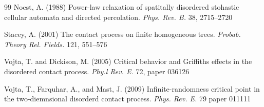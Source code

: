 \documentclass[11pt]{article}
\theoremstyle{definition}
\begin{document}
\begin{thebibliography}{99}
Noest, A. (1988)
Power-law relaxation of spatitally disordered stohastic cellular automata and directed percolation.
{\it Phys. Rev. B.} 38, 2715--2720



Stacey, A. (2001) The contact process on finite homogeneous trees. 
{\it Probab. Theory Rel. Fields.} 121, 551--576




Vojta, T. and Dickison, M. (2005)
Critical behavior and Griffiths effects in the disordered contact process.
{\it Phy.l Rev. E.} 72, paper 036126


Vojta, T., Farquhar, A., and Mast, J. (2009)
Infinite-randomness critical point in the two-diemnsional disorderd contact process.
{\it Phys. Rev. E.} 79 paper 011111 


\end{thebibliography}
\end{document}
